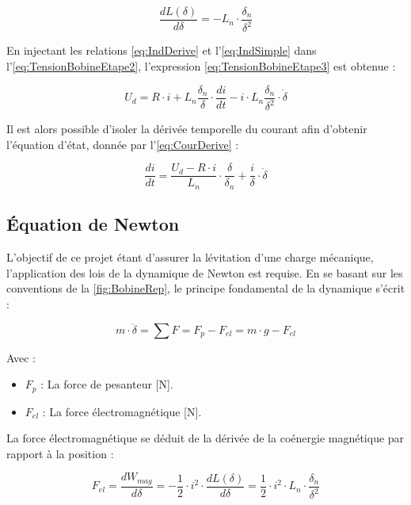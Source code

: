 \begin{equation}
    \frac{dL(\delta)}{d\delta} = -L_n \cdot \frac{\delta_n}{\delta^2}
    \label{eq:IndDerive}
\end{equation}

En injectant les relations \ref{eq:IndDerive} et l'\autoref{eq:IndSimple} dans l'\autoref{eq:TensionBobineEtape2}, l'expression \ref{eq:TensionBobineEtape3} est obtenue :

\begin{equation}
    U_d = R \cdot i + L_n \frac{\delta_n}{\delta} \cdot \frac{di}{dt} - i \cdot L_n \frac{\delta_n}{\delta^2} \cdot \dot{\delta}
    \label{eq:TensionBobineEtape3}
\end{equation}

Il est alors possible d'isoler la dérivée temporelle du courant afin d'obtenir l'équation d'état, donnée par l'\autoref{eq:CourDerive} :

\begin{equation}
    \frac{di}{dt} = \frac{U_d - R \cdot i}{L_n} \cdot \frac{\delta}{\delta_n} + \frac{i}{\delta} \cdot \dot{\delta}
    \label{eq:CourDerive}
\end{equation}

\subsection{Équation de Newton}
L'objectif de ce projet étant d'assurer la lévitation d'une charge mécanique, l'application des lois de la dynamique de Newton est requise. En se basant sur les conventions de la \autoref{fig:BobineRep}, le principe fondamental de la dynamique s'écrit :

\begin{equation}
    m \cdot \ddot{\delta} =\sum F = F_p - F_{el} = m \cdot g - F_{el}
    \label{eq:Newton1}
\end{equation}

Avec :
\begin{itemize}
    \item $F_p$ : La force de pesanteur [N].
    \item $F_{el}$ : La force électromagnétique [N].
\end{itemize}

La force électromagnétique se déduit de la dérivée de la coénergie magnétique par rapport à la position :
\label{subsec:Fele}

\begin{equation}
    F_{el} =\frac{dW_{mag}}{d\delta}= - \frac{1}{2} \cdot i^2 \cdot \frac{dL(\delta)}{d\delta} = \frac{1}{2} \cdot i^2 \cdot L_n \cdot \frac{\delta_n}{\delta^2}
    \label{eq:Fele}
\end{equation}

